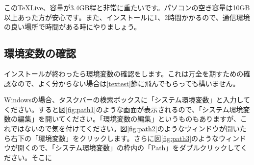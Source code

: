 この\TeX Live、容量が3.4GB程と非常に重たいです。パソコンの空き容量は10GB以上あった方が安心です。また、インストールに1、2時間かかるので、通信環境の良い場所で時間がある時にやりましょう。

\subsection{環境変数の確認}
インストールが終わったら環境変数の確認をします。これは万全を期すための確認なので、よく分からない場合は\ref{textest}節に飛んでもらっても構いません。

Windowsの場合、タスクバーの検索ボックスに「システム環境変数」と入力してください。すると図\ref{fig:path1}のような画面が表示されるので、「システム環境変数の編集」を開いてください。「環境変数の編集」というものもありますが、これではないので気を付けてください。図\ref{fig:path2}のようなウィンドウが開いたら右下の「環境変数」をクリックします。さらに図\ref{fig:path3}のようなウィンドウが開くので、「システム環境変数」の枠内の「Path」をダブルクリックしてください。そこに

